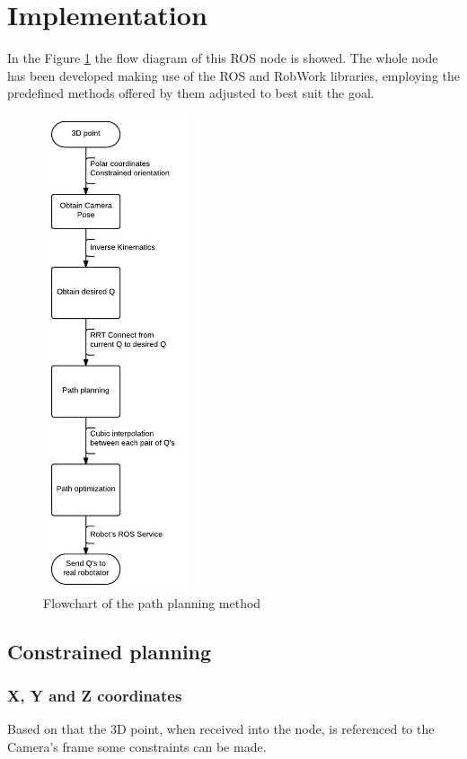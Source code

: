 \section{Implementation} %
\label{sec:implementation_pathplanning}
In the Figure \ref{fig:path_planning_flowchart} the flow diagram of this ROS node is showed. The whole node has been developed making use of the ROS and RobWork libraries, employing the predefined methods offered by them adjusted to best suit the goal.
\begin{figure}[htb]
	\centering
	\includegraphics[height=14cm]{figures/path_planning_flowchart}
	\caption{Flowchart of the path planning method}
	\label{fig:path_planning_flowchart}
\end{figure}

	\subsection{Constrained planning} %
	\label{sub:contrained_planning_implementation}
	\subsubsection{X, Y and Z coordinates} %
	\label{subsub:x_y_and_z_coordinates}
	Based on that the 3D point, when received into the node, is referenced to the Camera's frame some constraints can be made.

